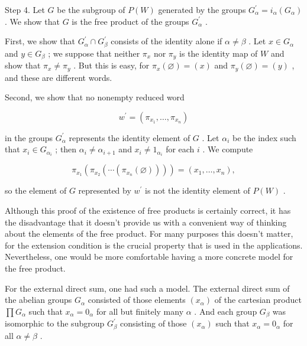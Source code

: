 Step 4. Let \(G\) be the subgroup of \(P\left( W\right)\) generated by the groups \({G}_{\alpha }^{\prime } = {i}_{\alpha }\left( {G}_{\alpha }\right)\) . We show that \(G\) is the free product of the groups \({G}_{\alpha }^{\prime }\) .

First, we show that \({G}_{\alpha }^{\prime } \cap  {G}_{\beta }^{\prime }\) consists of the identity alone if \(\alpha  \neq  \beta\) . Let \(x \in  {G}_{\alpha }\) and \(y \in  {G}_{\beta }\) ; we suppose that neither \({\pi }_{x}\) nor \({\pi }_{y}\) is the identity map of \(W\) and show that \({\pi }_{x} \neq  {\pi }_{y}\) . But this is easy, for \({\pi }_{x}\left( \varnothing \right)  = \left( x\right)\) and \({\pi }_{y}\left( \varnothing \right)  = \left( y\right)\) , and these are different words.

Second, we show that no nonempty reduced word

\[
{w}^{\prime } = \left( {{\pi }_{{x}_{1}},\ldots ,{\pi }_{{x}_{n}}}\right)
\]

in the groups \({G}_{\alpha }^{\prime }\) represents the identity element of \(G\) . Let \({\alpha }_{i}\) be the index such that \({x}_{i} \in  {G}_{{\alpha }_{i}}\) ; then \({\alpha }_{i} \neq  {\alpha }_{i + 1}\) and \({x}_{i} \neq  {1}_{{\alpha }_{i}}\) for each \(i\) . We compute

\[
{\pi }_{{x}_{1}}\left( {{\pi }_{{x}_{2}}\left( {\cdots \left( {{\pi }_{{x}_{n}}\left( \varnothing \right) }\right) }\right) }\right)  = \left( {{x}_{1},\ldots ,{x}_{n}}\right) ,
\]

so the element of \(G\) represented by \({w}^{\prime }\) is not the identity element of \(P\left( W\right)\) .

Although this proof of the existence of free products is certainly correct, it has the disadvantage that it doesn't provide us with a convenient way of thinking about the elements of the free product. For many purposes this doesn't matter, for the extension condition is the crucial property that is used in the applications. Nevertheless, one would be more comfortable having a more concrete model for the free product.

For the external direct sum, one had such a model. The external direct sum of the abelian groups \({G}_{\alpha }\) consisted of those elements \(\left( {x}_{\alpha }\right)\) of the cartesian product \(\prod {G}_{\alpha }\) such that \({x}_{\alpha } = {0}_{\alpha }\) for all but finitely many \(\alpha\) . And each group \({G}_{\beta }\) was isomorphic to the subgroup \({G}_{\beta }^{\prime }\) consisting of those \(\left( {x}_{\alpha }\right)\) such that \({x}_{\alpha } = {0}_{\alpha }\) for all \(\alpha  \neq  \beta\) .


